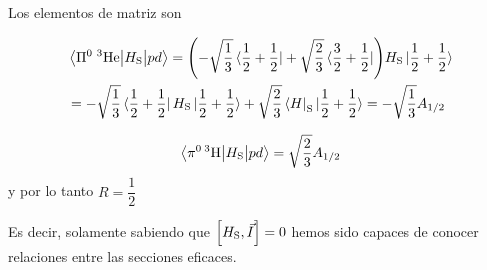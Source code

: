 Los elementos de matriz son
\noindent

\begin{minipage}{0.65\textwidth}
    \begin{equation*}
    \begin{aligned}
        &\mel{\Pi^0 \; ^3\text{He}}{H_\mathrm{S}}{p d} = 
\qty( - \sqrt{\frac{1}{3}} \bra{\frac{1}{2} +\frac{1}{2}} + \sqrt{\frac{2}{3}} \bra{\frac{3}{2} +\frac{1}{2}} ) H_\mathrm{S} \ket{\frac{1}{2} +\frac{1}{2}} \\&= - \sqrt{\frac{1}{3}} \bra{\frac{1}{2} +\frac{1}{2}} H_\mathrm{S} \ket{\frac{1}{2} +\frac{1}{2}} + \sqrt{\frac{2}{3}} \bra H_\mathrm{S} \ket{\frac{1}{2} +\frac{1}{2}}= - \sqrt{\frac{1}{3}} A_{1/2}
    \end{aligned}
\end{equation*}
\end{minipage}
\hfill
\begin{minipage}{0.25\textwidth}
     $$\mel{\pi^0\, ^3\text{H}}{H_\mathrm{S}}{pd}=\displaystyle \sqrt{\dfrac{2}{3}}A_{1/2}$$ y por lo tanto $R=\dfrac{1}{2}$
\end{minipage}\newpage
Es decir, solamente sabiendo que $\qty[H_\mathrm{S},\vec{I}]=0$ hemos sido capaces de conocer relaciones entre las secciones eficaces. 
